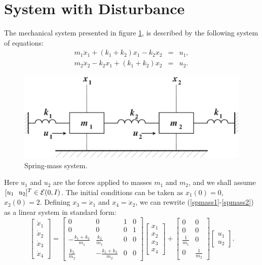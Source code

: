 \section{System with Disturbance}
The mechanical system presented in figure \ref{springmassfig}, is described
by the following system of equations:
\begin{eqnarray}
m_1\ddot{x}_1+(k_1+k_2)x_1-k_2x_2 & = & u_1, \label{spmass1}\\
m_2\ddot{x}_2-k_2x_1+(k_1+k_2)x_2 & = & u_2 . \label{spmass2}
\end{eqnarray}
\begin{figure}[htbp]
\centerline{
\includegraphics[height=5 cm]{springmass.eps}}
\caption{Spring-mass system.}
\label{springmassfig}
\end{figure}
Here $u_1$ and $u_2$ are the forces applied to masses $m_1$ and $m_2$,
and we shall assume $[u_1 ~~ u_2]^T\in\EE(0,I)$.
The initial conditions can be taken as $x_1(0)=0$, $x_2(0)=2$.
Defining $x_3=\dot{x}_1$ and $x_4=\dot{x}_2$, we can rewrite
(\ref{spmass1}-\ref{spmass2}) as a linear system in standard form:
\begin{equation}
\left[\begin{array}{c}
\dot{x}_1 \\
\dot{x}_2 \\
\dot{x}_3 \\
\dot{x}_4 \end{array}\right] = \left[\begin{array}{cccc}
0 & 0 & 1 & 0\\
0 & 0 & 0 & 1\\
-\frac{k_1+k_2}{m_1} & \frac{k_2}{m_1} & 0 & 0\\
\frac{k_2}{m_2} & -\frac{k_1+k_2}{m_2} & 0 & 0\end{array}\right]
\left[\begin{array}{c}
x_1 \\
x_2 \\
x_3 \\
x_4 \end{array}\right] + \left[\begin{array}{cc}
0 & 0\\
0 & 0\\
\frac{1}{m_1} & 0\\
0 & \frac{1}{m_2}\end{array}\right]\left[\begin{array}{c}
u_1\\
u_2\end{array}\right]. \label{spmassls}
\end{equation}

